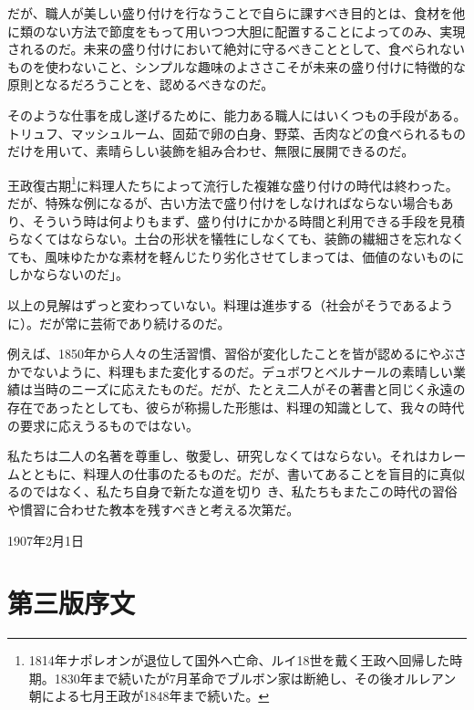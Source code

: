 \begin{Main}
だが、職人が美しい盛り付けを行なうことで自らに課すべき目的とは、食材を他に類のない方法で節度をもって用いつつ大胆に配置することによってのみ、実現されるのだ。未来の盛り付けにおいて絶対に守るべきこととして、食べられないものを使わないこと、シンプルな趣味のよささこそが未来の盛り付けに特徴的な原則となるだろうことを、認めるべきなのだ。

そのような仕事を成し遂げるために、能力ある職人にはいくつもの手段がある。トリュフ、マッシュルーム、固茹で卵の白身、野菜、舌肉などの食べられるものだけを用いて、素晴らしい装飾を組み合わせ、無限に展開できるのだ。

王政復古期\footnote{1814年ナポレオンが退位して国外へ亡命、ルイ18世を戴く王政へ回帰した時期。1830年まで続いたが7月革命でブルボン家は断絶し、その後オルレアン朝による七月王政が1848年まで続いた。}に料理人たちによって流行した複雑な盛り付けの時代は終わった。だが、特殊な例になるが、古い方法で盛り付けをしなければならない場合もあり、そういう時は何よりもまず、盛り付けにかかる時間と利用できる手段を見積らなくてはならない。土台の形状を犠牲にしなくても、装飾の繊細さを忘れなくても、風味ゆたかな素材を軽んじたり劣化させてしまっては、価値のないものにしかならないのだ」。

以上の見解はずっと変わっていない。料理は進歩する（社会がそうであるように）。だが常に芸術であり続けるのだ。

例えば、1850年から人々の生活習慣、習俗が変化したことを皆が認めるにやぶさかでないように、料理もまた変化するのだ。デュボワとベルナールの素晴しい業績は当時のニーズに応えたものだ。だが、たとえ二人がその著書と同じく永遠の存在であったとしても、彼らが称揚した形態は、料理の知識として、我々の時代の要求に応えうるものではない。

私たちは二人の名著を尊重し、敬愛し、研究しなくてはならない。それはカレームとともに、料理人の仕事のたるものだ。だが、書いてあることを盲目的に真似るのではなく、私たち自身で新たな道を切り
き、私たちもまたこの時代の習俗や慣習に合わせた教本を残すべきと考える次第だ。

\begin{flushright}
1907年2月1日
\end{flushright}

\newpage

\hypertarget{introduction-troisieme-edition}{%
\section{第三版序文}\label{introduction-troisieme-edition}}

\vspace*{1\zw}


\end{Main}
